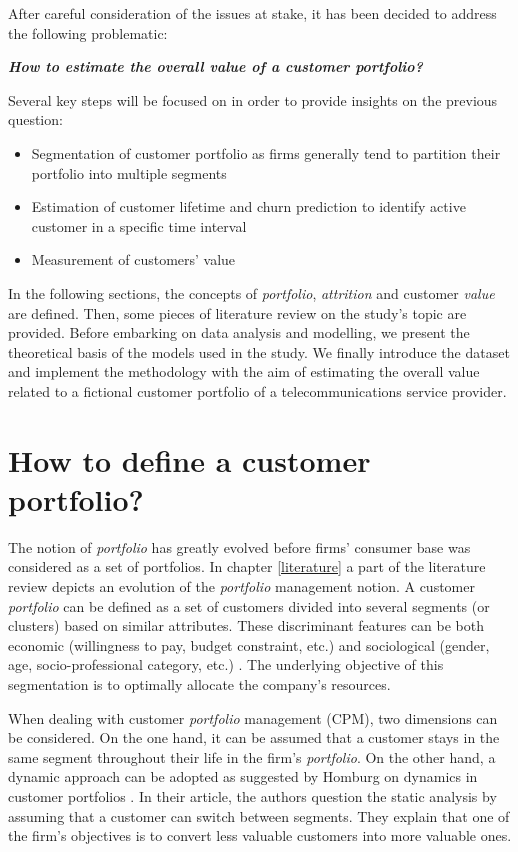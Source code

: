 \documentclass[
]{book}
\providecommand{\tightlist}{%
  \setlength{\itemsep}{0pt}\setlength{\parskip}{0pt}}
\begin{document}
After careful consideration of the issues at stake, it has been decided to address the following problematic:

\textbf{\emph{How to estimate the overall value of a customer portfolio?}}

Several key steps will be focused on in order to provide insights on the previous question:

\begin{itemize}
\tightlist
\item
  Segmentation of customer portfolio as firms generally tend to partition their portfolio into multiple segments
\item
  Estimation of customer lifetime and churn prediction to identify active customer in a specific time interval
\item
  Measurement of customers' value
\end{itemize}

In the following sections, the concepts of \emph{portfolio}, \emph{attrition} and customer \emph{value} are defined. Then, some pieces of literature review on the study's topic are provided. Before embarking on data analysis and modelling, we present the theoretical basis of the models used in the study. We finally introduce the dataset and implement the methodology with the aim of estimating the overall value related to a fictional customer portfolio of a telecommunications service provider.

\hypertarget{portfoliodef}{%
\section{How to define a customer portfolio?}\label{portfoliodef}}

The notion of \emph{portfolio} has greatly evolved before firms' consumer base was considered as a set of portfolios. In chapter \ref{literature} a part of the literature review depicts an evolution of the \emph{portfolio} management notion. A customer \emph{portfolio} can be defined as a set of customers divided into several segments (or clusters) based on similar attributes. These discriminant features can be both economic (willingness to pay, budget constraint, etc.) and sociological (gender, age, socio-professional category, etc.) . The underlying objective of this segmentation is to optimally allocate the company's resources.

When dealing with customer \emph{portfolio} management (CPM), two dimensions can be considered. On the one hand, it can be assumed that a customer stays in the same segment throughout their life in the firm's \emph{portfolio}. On the other hand, a dynamic approach can be adopted as suggested by Homburg on dynamics in customer portfolios \citep{MANAGING_DYNAMICS_CUSTOMER_PORTFOLIO}. In their article, the authors question the static analysis by assuming that a customer can switch between segments. They explain that one of the firm's objectives is to convert less valuable customers into more valuable ones.
\end{document}
